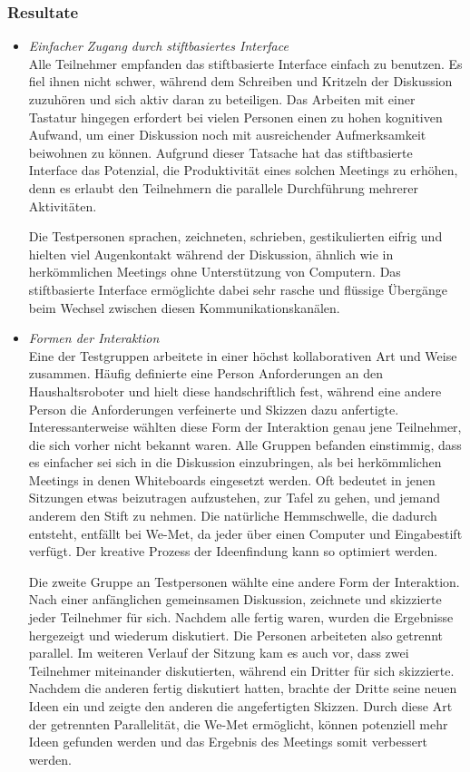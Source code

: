 \subsubsection{Resultate}
\begin{itemize}
	\item \textit{Einfacher Zugang durch stiftbasiertes Interface}\\
	Alle Teilnehmer empfanden das stiftbasierte Interface einfach zu benutzen. Es fiel ihnen nicht schwer, während dem Schreiben und Kritzeln der Diskussion zuzuhören und sich aktiv daran zu beteiligen. Das Arbeiten mit einer Tastatur hingegen erfordert bei vielen Personen einen zu hohen kognitiven Aufwand, um einer Diskussion noch mit ausreichender Aufmerksamkeit beiwohnen zu können. Aufgrund dieser Tatsache hat das stiftbasierte Interface das Potenzial, die Produktivität eines solchen Meetings zu erhöhen, denn es erlaubt den Teilnehmern die parallele Durchführung mehrerer Aktivitäten.
	
	Die Testpersonen sprachen, zeichneten, schrieben, gestikulierten eifrig und hielten viel Augenkontakt während der Diskussion, ähnlich wie in herkömmlichen Meetings ohne Unterstützung von Computern. Das stiftbasierte Interface ermöglichte dabei sehr rasche und flüssige Übergänge beim Wechsel zwischen diesen Kommunikationskanälen.
	
	\item \textit{Formen der Interaktion}\\
	Eine der Testgruppen arbeitete in einer höchst kollaborativen Art und Weise zusammen. Häufig definierte eine Person Anforderungen an den Haushaltsroboter und hielt diese handschriftlich fest, während eine andere Person die Anforderungen verfeinerte und Skizzen dazu anfertigte. Interessanterweise wählten diese Form der Interaktion genau jene Teilnehmer, die sich vorher nicht bekannt waren. Alle Gruppen befanden einstimmig, dass es einfacher sei sich in die Diskussion einzubringen, als bei herkömmlichen Meetings in denen Whiteboards eingesetzt werden. Oft bedeutet in jenen Sitzungen etwas beizutragen aufzustehen, zur Tafel zu gehen, und jemand anderem den Stift zu nehmen. Die natürliche Hemmschwelle, die dadurch entsteht, entfällt bei We-Met, da jeder über einen Computer und Eingabestift verfügt. Der kreative Prozess der Ideenfindung kann so optimiert werden.
	
	Die zweite Gruppe an Testpersonen wählte eine andere Form der Interaktion. Nach einer anfänglichen gemeinsamen Diskussion, zeichnete und skizzierte jeder Teilnehmer für sich. Nachdem alle fertig waren, wurden die Ergebnisse hergezeigt und wiederum diskutiert. Die Personen arbeiteten also getrennt parallel. Im weiteren Verlauf der Sitzung kam es auch vor, dass zwei Teilnehmer miteinander diskutierten, während ein Dritter für sich skizzierte. Nachdem die anderen fertig diskutiert hatten, brachte der Dritte seine neuen Ideen ein und zeigte den anderen die angefertigten Skizzen. Durch diese Art der getrennten Parallelität, die We-Met ermöglicht, können potenziell mehr Ideen gefunden werden und das Ergebnis des Meetings somit verbessert werden.
	

\end{itemize}
